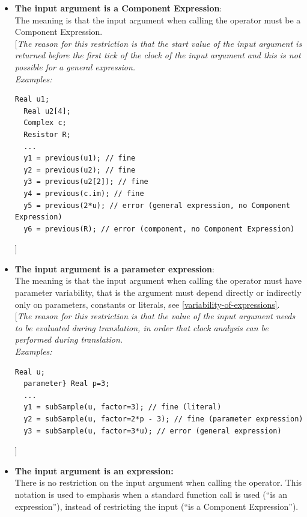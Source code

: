 \documentclass[10pt,a4paper]{report}
\begin{document}
\begin{itemize}
\item
  \textbf{The input argument is a Component Expression}:\\
  The meaning is that the input argument when calling the operator must
  be a Component Expression.\\
  {[}\emph{The reason for this restriction is that the start value of
  the input argument is returned before the first tick of the clock of
  the input argument and this is not possible for a general
  expression.}\\
  \emph{Examples:}\\
\begin{lstlisting}[language=modelica]
  Real u1;
  Real u2[4];
  Complex c;
  Resistor R;
  ...
  y1 = previous(u1); // fine
  y2 = previous(u2); // fine
  y3 = previous(u2[2]); // fine
  y4 = previous(c.im); // fine
  y5 = previous(2*u); // error (general expression, no Component Expression)
  y6 = previous(R); // error (component, no Component Expression)
\end{lstlisting}
{]}
\item
  \textbf{The input argument is a parameter expression}:\\
  The meaning is that the input argument when calling the operator must
  have parameter variability, that is the argument must depend directly
  or indirectly only on parameters, constants or literals, see 
  \ref{variability-of-expressions}.\\
  {[}\emph{The reason for this restriction is that the value of the
  input argument needs to be evaluated during translation, in order that
  clock analysis can be performed during translation.\\
  Examples:}\\

\begin{lstlisting}[language=modelica]
  Real u;
  parameter} Real p=3;
  ...
  y1 = subSample(u, factor=3); // fine (literal)
  y2 = subSample(u, factor=2*p - 3); // fine (parameter expression)
  y3 = subSample(u, factor=3*u); // error (general expression)
\end{lstlisting}
{]}
\end{itemize}

\begin{itemize}
\item
  \textbf{The input argument is an expression:\\
  }There is no restriction on the input argument when calling the
  operator. This notation is used to emphasis when a standard function
  call is used (``is an expression''), instead of restricting the input
  (``is a Component Expression'').
\end{itemize}
\end{document}
